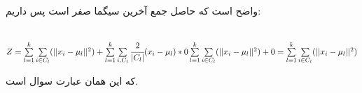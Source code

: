 \documentclass[a4paper,14pt]{extarticle}
\begin{document}
واضح است که حاصل جمع آخرین سیگما صفر است پس داریم:
\begin{latin}
	~\\
	$
	Z =  \sum\limits_{l = 1}^k  \sum\limits_{i \in C_l} (|| x_i -  \mu_l || ^2 ) +  \sum\limits_{l = 1}^k  \sum\limits_{i, C_l} \cfrac{2}{{|C_l|}}( x_i -  \mu_l ) * 0
	 \sum\limits_{l = 1}^k  \sum\limits_{i \in C_l} (|| x_i -  \mu_l || ^2 ) +  0
	 \\
	 = \sum\limits_{l = 1}^k  \sum\limits_{i \in C_l} (|| x_i -  \mu_l || ^2) 
	$
\end{latin}
که این همان عبارت سوال است.
\newpage
{}
\end{document}
